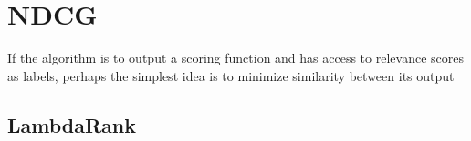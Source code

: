 \section{NDCG}
\label{sec:ndcg}
If the algorithm is to output a scoring function and has access to relevance
scores as labels, perhaps the simplest idea is to minimize similarity between
its output 





\subsection{LambdaRank}
